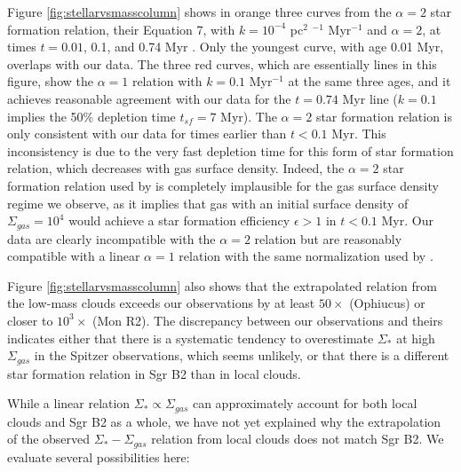 \documentclass[twocolumn]{aastex61}
\begin{document}
Figure \ref{fig:stellarvsmasscolumn}  shows in orange three curves from the
\citet{Gutermuth2011a} $\alpha=2$ star formation relation, their Equation 7,
with $k=10^{-4}$ pc$^{2}$ \msun$^{-1}$ Myr$^{-1}$ and $\alpha=2$, at times
$t=0.01$, 0.1, and 0.74 Myr .  Only the youngest curve, with age 0.01 Myr,
overlaps with our data.  The three red curves, which are essentially lines in
this figure, show the $\alpha=1$ relation with $k=0.1$ Myr$^{-1}$ at the same
three ages, and it achieves reasonable agreement with our data for the $t=0.74$
Myr line ($k=0.1$ \permyr implies the 50\% depletion time $t_{sf}=7$ Myr).  The
$\alpha=2$ star formation relation  is only consistent with our
data for times earlier than $t<0.1$ Myr.  This inconsistency is due to the very
fast depletion time for this form of star formation relation, which decreases
with gas surface density.  Indeed, the $\alpha=2$ star formation relation used
by \citet{Gutermuth2011a} is completely implausible for the gas surface density
regime we observe, as it implies that gas with an initial surface density of
$\Sigma_{gas}=10^4$ \msun \perspc would achieve a star formation efficiency
$\epsilon>1$ in $t<0.1$ Myr.  Our data are clearly incompatible with the
$\alpha=2$ relation but are reasonably compatible with a linear $\alpha=1$
relation with the same normalization used by \citet{Gutermuth2011a}.


Figure \ref{fig:stellarvsmasscolumn} also shows that the extrapolated relation
from the low-mass clouds exceeds our observations by at least $50\times$
(Ophiucus) or closer to $10^3\times$ (Mon R2).   The discrepancy between our
observations and theirs indicates either that there is a systematic tendency to
overestimate $\Sigma_*$ at high $\Sigma_{gas}$ in the Spitzer observations,
which seems unlikely, or that there is a different star formation relation in
Sgr B2 than in local clouds.


While a linear relation $\Sigma_* \propto \Sigma_{gas}$ can approximately
account for both local clouds and Sgr B2 as a whole, we have not yet explained
why the extrapolation of the observed $\Sigma_* - \Sigma_{gas}$ relation from
local clouds does not match Sgr B2.  We evaluate several possibilities here:
\end{document}
